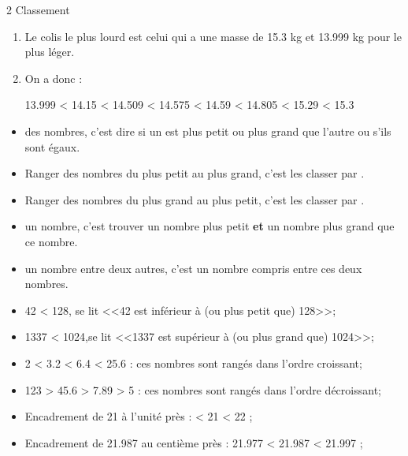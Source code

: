 \documentclass[12pt,a4paper]{article}
\begin{document}
\begin{myactrep}{2 Classement}
	\begin{enumerate}
		\item Le colis le plus lourd est celui qui a une masse de \num{15.3} kg et \num{13.999} kg pour le plus léger.
		\item On a donc :
		
			\num{13.999} < \num{14.15} < \num{14.509} < \num{14.575} < \num{14.59} <  \num{14.805} < \num{15.29} < \num{15.3}
	\end{enumerate}
\end{myactrep}

\begin{mydefs}
	\begin{itemize}
		\item {} des nombres, c'est dire si un est plus petit ou plus grand que l'autre ou s'ils sont égaux.
		
		\item Ranger des nombres du plus petit au plus grand, c'est les classer par .
		
		\item Ranger des nombres du plus grand au plus petit, c'est les classer par .
		
		\item {} un nombre, c'est trouver un nombre plus petit \textbf{et} un nombre plus grand que ce nombre.
		
		\item {} un nombre entre deux autres, c'est un nombre compris entre ces deux nombres.
	\end{itemize}
\end{mydefs}

\begin{myexs}
	\begin{itemize}
		\item 42 < 128, \pause se lit <<42 est inférieur à (ou plus petit que) 128>>;\pause
		\item 1337 < 1024,\pause se lit <<\num{1337} est supérieur à (ou plus grand que) \num{1024}>>;\pause
		\item 2 < \num{3.2} < \num{6.4} < \num{25.6} : ces nombres sont rangés dans l'ordre \pause croissant;\pause
		\item 123 > \num{45.6} > \num{7.89} > \num{5} : ces nombres sont rangés dans l'ordre \pause décroissant;\pause
		\item Encadrement de 21 à l'unité près :  < 21 < 22 ;\pause
		\item Encadrement de \num{21.987} au centième près : \pause \num{21.977} < \num{21.987} < \num{21.997} ;\pause
	\end{itemize}
\end{myexs}
\end{document}
